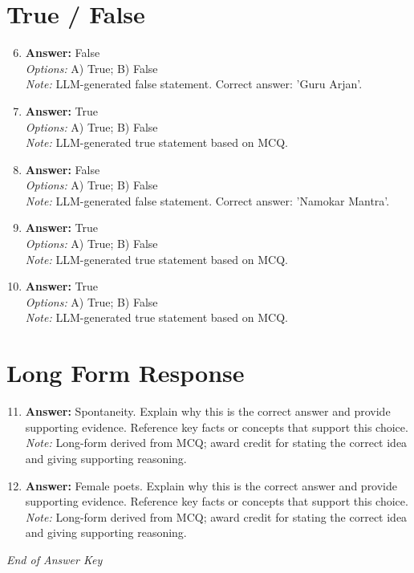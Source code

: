 \documentclass[12pt]{article}
\begin{document}
\section*{True / False}
\begin{enumerate}[label=\arabic*.]
\setcounter{enumi}{5}
\item \textbf{Answer:} False
\\ \textit{Options:} A) True; B) False
\\ \textit{Note:} LLM-generated false statement. Correct answer: 'Guru Arjan'.
\item \textbf{Answer:} True
\\ \textit{Options:} A) True; B) False
\\ \textit{Note:} LLM-generated true statement based on MCQ.
\item \textbf{Answer:} False
\\ \textit{Options:} A) True; B) False
\\ \textit{Note:} LLM-generated false statement. Correct answer: 'Namokar Mantra'.
\item \textbf{Answer:} True
\\ \textit{Options:} A) True; B) False
\\ \textit{Note:} LLM-generated true statement based on MCQ.
\item \textbf{Answer:} True
\\ \textit{Options:} A) True; B) False
\\ \textit{Note:} LLM-generated true statement based on MCQ.
\end{enumerate}

\section*{Long Form Response}
\begin{enumerate}[label=\arabic*.]
\setcounter{enumi}{10}
\item \textbf{Answer:} Spontaneity. Explain why this is the correct answer and provide supporting evidence. Reference key facts or concepts that support this choice.
\\ \textit{Note:} Long-form derived from MCQ; award credit for stating the correct idea and giving supporting reasoning.
\item \textbf{Answer:} Female poets. Explain why this is the correct answer and provide supporting evidence. Reference key facts or concepts that support this choice.
\\ \textit{Note:} Long-form derived from MCQ; award credit for stating the correct idea and giving supporting reasoning.
\end{enumerate}

\vfill
\noindent\textit{End of Answer Key}
\end{document}

